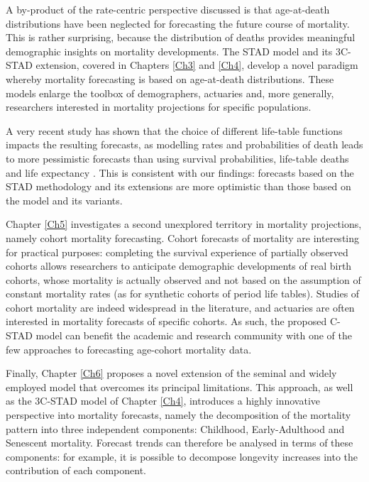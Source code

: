 \documentclass[Thesis]{subfiles}
\begin{document}
A by-product of the rate-centric perspective discussed is that age-at-death distributions have been neglected for forecasting the future course of mortality. This is rather surprising, because the distribution of deaths provides meaningful demographic insights on mortality developments. The STAD model and its 3C-STAD extension, covered in Chapters \ref{Ch3} and \ref{Ch4}, develop a novel paradigm whereby mortality forecasting is based on age-at-death distributions. These models enlarge the toolbox of demographers, actuaries and, more generally, researchers interested in mortality projections for specific populations. 

A very recent study has shown that the choice of different life-table functions impacts the resulting forecasts, as modelling rates and probabilities of death leads to more pessimistic forecasts than using survival probabilities, life-table deaths and life expectancy \citep{bergeron2019impact}. This is consistent with our findings: forecasts based on the STAD methodology and its extensions are more optimistic than those based on the \cite{lee1992modeling} model and its variants.

Chapter \ref{Ch5} investigates a second unexplored territory in mortality projections, namely cohort mortality forecasting. Cohort forecasts of mortality are interesting for practical purposes: completing the survival experience of partially observed cohorts allows researchers to anticipate demographic developments of real birth cohorts, whose mortality is actually observed and not based on the assumption of constant mortality rates (as for synthetic cohorts of period life tables). Studies of cohort mortality are indeed widespread in the literature, and actuaries are often interested in mortality forecasts of specific cohorts. As such, the proposed C-STAD model can benefit the academic and research community with one of the few approaches to forecasting age-cohort mortality data.

Finally, Chapter \ref{Ch6} proposes a novel extension of the seminal and widely employed \cite{lee1992modeling} model that overcomes its principal limitations. This approach, as well as the 3C-STAD model of Chapter \ref{Ch4}, introduces a highly innovative perspective into mortality forecasts, namely the decomposition of the mortality pattern into three independent components: Childhood, Early-Adulthood and Senescent mortality. Forecast trends can therefore be analysed in terms of these components: for example, it is possible to decompose longevity increases into the contribution of each component.  
\end{document}

